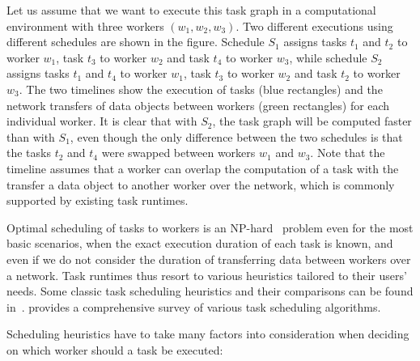 Let us assume that we want to execute this task graph in a computational environment with three
workers $(w_1, w_2, w_3)$. Two different executions using different schedules are shown in the
figure.
Schedule $S_1$ assigns tasks $t_1$ and $t_2$ to
worker $w_1$, task $t_3$ to worker $w_2$ and
task $t_4$ to worker $w_3$, while schedule $S_2$
assigns tasks $t_1$ and $t_4$ to worker $w_1$,
task $t_3$ to worker $w_2$ and task $t_2$ to
worker $w_3$. The two timelines show the execution of tasks (blue rectangles) and
the network transfers of data objects between workers (green rectangles) for each individual
worker. It is clear that with $S_2$, the task graph will be computed faster than
with $S_1$, even though the only difference between the two schedules is that the
tasks $t_2$ and $t_4$ were swapped between workers
$w_1$ and $w_3$. Note that the timeline assumes that a worker
can overlap the computation of a task with the transfer a data object to another worker over the
network, which is commonly supported by existing task runtimes.

Optimal scheduling of tasks to workers is an NP-hard~\cite{Ullman1975} problem even for the
most basic scenarios, when the exact execution duration of each task is known, and even if we do
not consider the duration of transferring data between workers over a network. Task runtimes thus
resort to various heuristics tailored to their users' needs. Some classic task scheduling
heuristics and their comparisons can be found in~\cite{estee,hlfet1974,kwok1998benchmarking,hagras2003static,wang2018list}. 
provides a comprehensive survey of various task scheduling algorithms.

Scheduling heuristics have to take many factors into consideration when deciding on which worker
should a task be executed:

